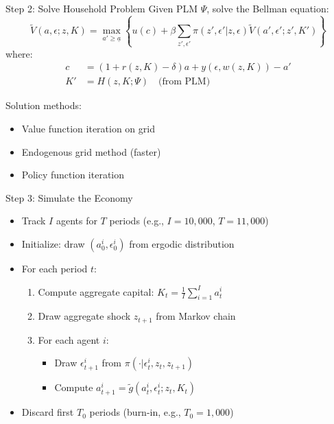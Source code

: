 \documentclass[aspectratio=169]{beamer}
\newcommand{\1}{\mathbf{1}}
\begin{document}
\begin{frame}{Step 2: Solve Household Problem}
  \small
  Given PLM $\Psi$, solve the Bellman equation:
  \[
  \tilde{V}(a, \epsilon; z, K) = \max_{a' \geq \underline{a}} \left\{ u(c) + \beta \sum_{z', \epsilon'} \pi(z', \epsilon' | z, \epsilon) \tilde{V}(a', \epsilon'; z', K') \right\}
  \]
  where:
  \begin{align*}
  c &= (1 + r(z, K) - \delta) a + y(\epsilon, w(z, K)) - a' \\
  K' &= H(z, K; \Psi) \quad \text{(from PLM)}
  \end{align*}
  
  Solution methods:
  \begin{itemize}
      \item Value function iteration on grid
      \item Endogenous grid method (faster)
      \item Policy function iteration
  \end{itemize}
\end{frame}

\begin{frame}{Step 3: Simulate the Economy}
  \begin{itemize}
      \item Track $I$ agents for $T$ periods (e.g., $I = 10,000$, $T = 11,000$)
      \item Initialize: draw $(a_0^i, \epsilon_0^i)$ from ergodic distribution
      \item For each period $t$:
      \begin{enumerate}
          \item Compute aggregate capital: $K_t = \frac{1}{I} \sum_{i=1}^{I} a_t^i$
          \item Draw aggregate shock $z_{t+1}$ from Markov chain
          \item For each agent $i$:
          \begin{itemize}
              \item Draw $\epsilon_{t+1}^i$ from $\pi(\cdot | \epsilon_t^i, z_t, z_{t+1})$
              \item Compute $a_{t+1}^i = \tilde{g}(a_t^i, \epsilon_t^i; z_t, K_t)$
          \end{itemize}
      \end{enumerate}
      \item Discard first $T_0$ periods (burn-in, e.g., $T_0 = 1,000$)
  \end{itemize}
\end{frame}
\end{document}
